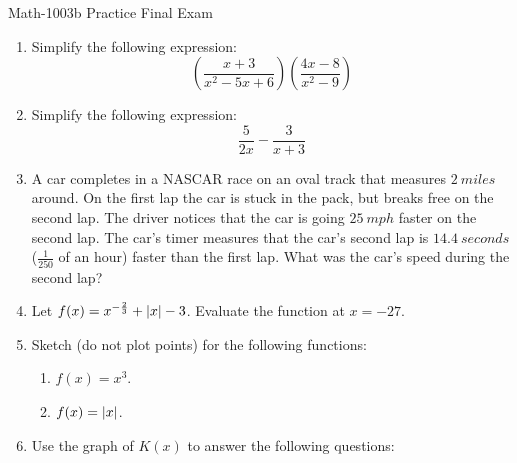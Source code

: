 \documentclass[letterpaper,12pt,fleqn]{article}
\begin{document}
\begin{center}
\Large Math-1003b Practice Final Exam
\end{center}

\vspace{1in}

\begin{enumerate}
\item Simplify the following expression:
  \[\left(\frac{x+3}{x^2-5x+6}\right)\left(\frac{4x-8}{x^2-9}\right)\]

\item Simplify the following expression:
  \[\frac{5}{2x}-\frac{3}{x+3}\]

\item A car completes in a NASCAR race on an oval track that measures
  $\SI{2}{miles}$ around. On the first lap the car is stuck in the pack, but
  breaks free on the second lap. The driver notices that the car is going
  $\SI{25}{mph}$ faster on the second lap. The car's timer measures that the
  car's second lap is $\SI{14.4}{seconds}$ ($\frac{1}{250}$ of an hour)
  faster than the first lap. What was the car's speed during the second lap?

\item Let $f(x)=x^{-\frac{2}{3}}+\lvert x\rvert-3$. Evaluate the function at
  $x=-27$.

\item Sketch (do not plot points) for the following functions:
  \begin{enumerate}
  \item $f(x)=x^3$.

\newpage
  \item $f(x)=\lvert x\rvert$.


  \end{enumerate}

\item Use the graph of $K(x)$ to answer the following questions:



\end{enumerate}
\end{document}
